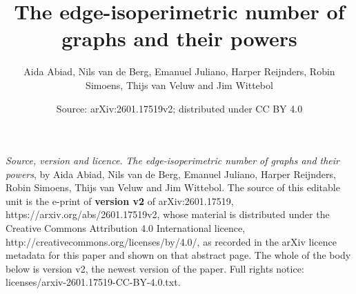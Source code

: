 \documentclass[10pt,a4paper]{amsart}
\theoremstyle{definition}
\begin{document}
\title{The edge-isoperimetric number of graphs and their powers}
\author{Aida Abiad, Nils van de Berg, Emanuel Juliano, Harper Reijnders, Robin Simoens, Thijs van Veluw and Jim Wittebol}
\date{Source: arXiv:2601.17519v2; distributed under CC BY 4.0}
\maketitle
\noindent\emph{Source, version and licence.} \emph{The edge-isoperimetric number of graphs and their powers}, by Aida Abiad, Nils van de Berg, Emanuel Juliano, Harper Reijnders, Robin Simoens, Thijs van Veluw and Jim Wittebol. The source of this editable unit is the e-print of \textbf{version v2} of arXiv:2601.17519, https://arxiv.org/abs/2601.17519v2, whose material is distributed under the Creative Commons Attribution 4.0 International licence, http://creativecommons.org/licenses/by/4.0/, as recorded in the arXiv licence metadata for this paper and shown on that abstract page. The whole of the body below is version v2, the newest version of the paper. Full rights notice: licenses/arxiv-2601.17519-CC-BY-4.0.txt.\par\smallskip
\end{document}
